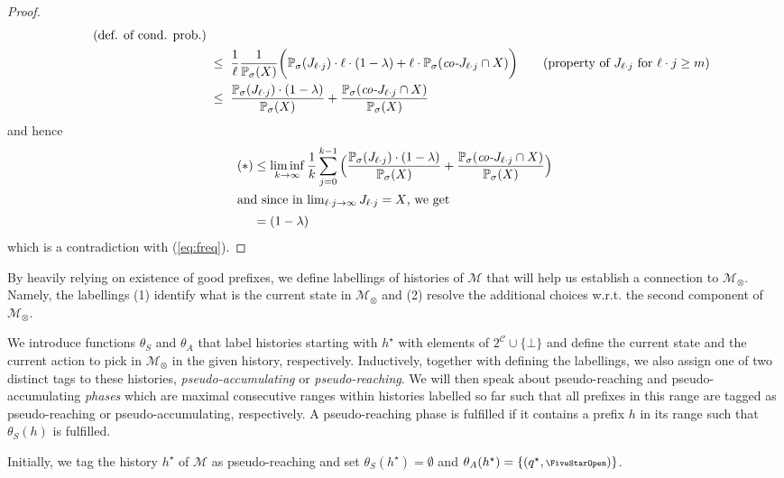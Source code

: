 \documentclass[a4paper,UKenglish]{lipics}
\newcommand{\symbopen}{\text{\scriptsize\FiveStarOpen}}
\newcommand{\mdp}{\mathcal{M}}
\renewcommand{\Pr}[3][]{\ifblank{#1}{\mathbb{P}_{#2}}{\mathbb{P}^{#1}_{#2}}(#3)}
\newcommand{\fix}[1]{{#1^\star}}
\newcommand{\fixq}{\fix{q}}
\newcommand{\fixh}{\fix{h}}
\newcommand{\compl}[1]{\textit{co-}#1}
\newcommand{\thetas}{\theta_S}
\newcommand{\thetaa}{\theta_A}
\begin{document}
\begin{proof}
\begin{align*}
	\tag{def. of cond. prob.}\\
	& \; \le \;
	\frac{1}{\ell} \frac{1}{\Pr\sigma{X}}\bigg( \Pr\sigma{J_{\ell\cdot j}} \cdot \ell\cdot(1-\lambda) + \ell\cdot \Pr{\sigma}{\compl{J_{\ell\cdot j}} \cap X}\bigg)\tag{property of $J_{\ell\cdot j}$ for $\ell\cdot j\ge m$}\\
	& \; \le \;
	\frac{\Pr\sigma{J_{\ell\cdot j}} \cdot (1-\lambda)}{\Pr\sigma{X}} + \frac{\Pr{\sigma}{\compl{J_{\ell\cdot j}} \cap X}}{\Pr\sigma{X}}
	\end{align*}
	and hence
	\begin{align*}
	(\ast) &\le \liminf_{k\rightarrow \infty} \frac{1}{k} \sum_{j=0}^{k-1} \Big(\frac{\Pr\sigma{J_{\ell\cdot j}} \cdot (1-\lambda)}{\Pr\sigma{X}} + \frac{\Pr{\sigma}{\compl{J_{\ell\cdot j}} \cap X}}{\Pr\sigma{X}}\Big)\\
	\intertext{and since in $\lim_{\ell\cdot j \rightarrow \infty} J_{\ell\cdot j} = X$, we get}
	&= (1-\lambda)
	\end{align*}
	which is a contradiction with (\ref{eq:freq}).
\end{proof}


By heavily relying on existence of good prefixes, we define labellings of histories of $\mdp$ that will help us establish a connection to $\mdp_\otimes$. Namely, the labellings (1) identify what is the current state in $\mdp_\otimes$ and (2) resolve the additional choices w.r.t. the second component of $\mdp_\otimes$.

We introduce functions $\thetas$ and $\thetaa$ that label histories starting with $\fixh$ with elements of $2^\mathcal{C} \cup \{\bot\}$ and define the current state and the current action to pick in $\mdp_\otimes$ in the given history, respectively. Inductively, together with defining the labellings, we also assign one of two distinct tags to these histories, {\em pseudo-accumulating} or {\em pseudo-reaching}.
We will then speak about pseudo-reaching and pseudo-accumulating \emph{phases} which are maximal consecutive ranges within histories labelled so far such that all prefixes in this range are tagged as pseudo-reaching or pseudo-accumulating, respectively. A pseudo-reaching phase is fulfilled if it contains a prefix $h$ in its range such that $\thetas(h)$ is fulfilled. 





Initially, we tag the history $\fixh$ of $\mdp$ as pseudo-reaching and set $\thetas(\fixh) = \emptyset$ and $\thetaa(\fixh) = \{(\fixq,\symbopen)\}$.
\end{document}
